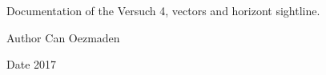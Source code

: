 Documentation of the Versuch 4, vectors and horizont sightline.

\begin{DoxyAuthor}{Author}
Can Oezmaden 
\end{DoxyAuthor}
\begin{DoxyDate}{Date}
2017 
\end{DoxyDate}
